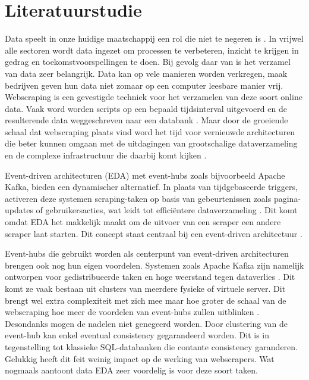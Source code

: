 \section{Literatuurstudie}%
\label{sec:literatuurstudie}


Data speelt in onze huidige maatschappij een rol die niet te negeren is \autocite{lohr2012age}. In vrijwel alle sectoren wordt data ingezet om processen te verbeteren, inzicht te krijgen in gedrag en toekomstvoorspellingen te doen. Bij gevolg daar van is het verzamel van data zeer belangrijk. Data kan op vele manieren worden verkregen, maak bedrijven geven hun data niet zomaar op een computer leesbare manier vrij. Webscraping is een gevestigde techniek voor het verzamelen van deze soort online data. Vaak word worden scripts op een bepaald tijdsinterval uitgevoerd en de resulterende data weggeschreven naar een databank \autocite{zhao2022web}. Maar door de groeiende schaal dat webscraping plaats vind word het tijd voor vernieuwde architecturen die beter kunnen omgaan met de uitdagingen van grootschalige dataverzameling en de complexe infrastructuur die daarbij komt kijken \autocite{khder2021web}.

Event-driven architecturen (EDA) met event-hubs zoals bijvoorbeeld Apache Kafka, bieden een dynamischer alternatief. In plaats van tijdgebaseerde triggers, activeren deze systemen scraping-taken op basis van gebeurtenissen zoals pagina-updates of gebruikersacties, wat leidt tot efficiëntere dataverzameling \autocite{coronado2015context}. Dit komt omdat EDA het makkelijk maakt om de uitvoer van een scraper een andere scraper laat starten. Dit concept staat centraal bij een event-driven architectuur \autocite{michelson2006event}.

Event-hubs die gebruikt worden als centerpunt van event-driven architecturen brengen ook nog hun eigen voordelen. Systemen zoals Apache Kafka zijn namelijk ontworpen voor gedistribueerde taken en hoge weerstand tegen dataverlies \autocite{garg2013apache}. Dit komt ze vaak bestaan uit clusters van meerdere fysieke of virtuele server. Dit brengt wel extra complexiteit met zich mee maar hoe groter de schaal van de webscraping hoe meer de voordelen van event-hubs zullen uitblinken \autocite{vyas2022performance}. Desondanks mogen de nadelen niet genegeerd worden. Door clustering van de event-hub kan enkel eventual consistency gegarandeerd worden. Dit is in tegenstelling tot klassieke SQL-databanken die contante consistency garanderen. Gelukkig heeft dit feit weinig impact op de werking van webscrapers. Wat nogmaals aantoont data EDA zeer voordelig is voor deze soort taken.


